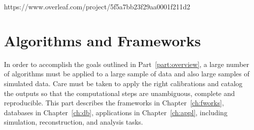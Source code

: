 \documentclass{dune} %
\begin{document}
\pagestyle{titlepage}
%
\cleardoublepage


\cleardoublepage

% 


https://www.overleaf.com/project/5f5a7bb23f29aa0001f211d2









\part{Algorithms and Frameworks} %

In order to accomplish the goals outlined in Part~\ref{part:overview}, a large number of algorithms must be applied to a large sample of data and also large samples of simulated data.  Care must be taken to apply the right calibrations and catalog the outputs so that the computational steps are unambiguous, complete and reproducible.  This part describes the frameworks in Chapter~\ref{ch:fworks}, databases in Chapter~\ref{ch:db}, applications in Chapter~\ref{ch:appl}, including simulation, reconstruction, and analysis tasks.

\cleardoublepage

\cleardoublepage


\cleardoublepage



\end{document}
